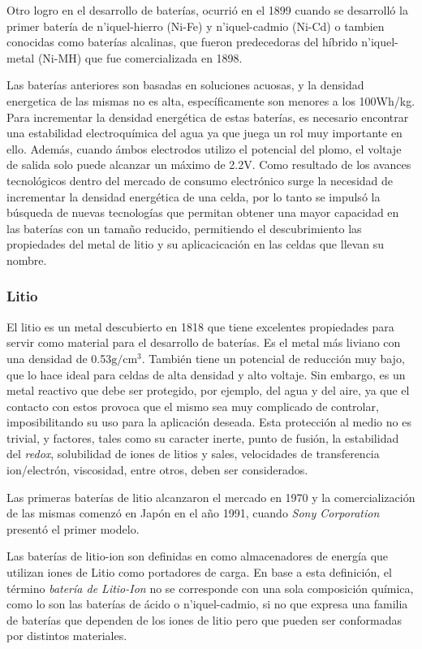 \documentclass[10pt,a4paper]{article}
\begin{document}
\noindent Otro logro en el desarrollo de baterías, ocurrió en el 1899 cuando se
desarrolló la primer batería de n'iquel-hierro (Ni-Fe) y n'iquel-cadmio (Ni-Cd) o
tambien conocidas como baterías alcalinas, que fueron predecedoras del híbrido
n'iquel-metal (Ni-MH) que fue comercializada en 1898.

\noindent Las baterías anteriores son basadas en soluciones acuosas, y la
densidad energetica de las mismas no es alta, espec\'ificamente son menores a 
los 100Wh/kg. Para incrementar la densidad energética de estas baterías, es
necesario encontrar una estabilidad electroquímica del agua ya que juega un rol
muy importante en ello. Además, cuando \'ambos electrodos utilizo el potencial 
del plomo, el voltaje de salida solo puede alcanzar un máximo de 2.2V.
Como resultado de los avances tecnol\'ogicos dentro del mercado de consumo
electr\'onico surge la necesidad de incrementar la densidad  energética de una 
celda, por lo tanto se impuls\'o la b\'usqueda de nuevas tecnolog\'ias que
permitan obtener una mayor capacidad en las bater\'ias con un tamaño reducido, 
permitiendo el descubrimiento las propiedades del metal de litio y su 
aplicacicación en las celdas que llevan su nombre.

\subsubsection{Litio}

El litio es un metal descubierto en 1818 que tiene excelentes propiedades para
servir como material para el desarrollo de baterías. Es el metal m\'as liviano
con una densidad de 0.53$\mathrm{g/cm^3}$. Tambi\'en tiene un potencial de
reducci\'on muy bajo, que lo hace ideal para celdas de alta densidad y alto
voltaje. Sin embargo, es un metal reactivo que debe ser protegido, por ejemplo,
del agua y del aire, ya que el contacto con estos provoca que el mismo sea muy
complicado de controlar, imposibilitando su uso para la aplicación deseada. Esta
protección al medio no es trivial, y factores, tales como su caracter inerte,
punto de fusión, la estabilidad del \emph{redox}, solubilidad de iones de litios
y sales, velocidades de transferencia ion/electrón, viscosidad, entre otros,
deben ser considerados.

\noindent Las primeras baterías de litio alcanzaron el mercado en 1970 y la
comercialización de las mismas comenzó en Japón en el año 1991, cuando
\emph{Sony Corporation} presentó el primer modelo.

\noindent Las baterías de litio-ion son definidas en \cite{def_liion} como
almacenadores de energía que utilizan iones de Litio como portadores de carga.
En base a esta definición, el término \emph{batería de Litio-Ion} no se
corresponde con una sola composición química, como lo son las baterías de ácido
o n'iquel-cadmio, si no que expresa una familia de baterías que dependen de los
iones de litio pero que pueden ser conformadas por distintos materiales.
\end{document}
